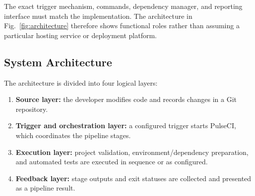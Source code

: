 \documentclass[conference]{IEEEtran}
\begin{document}
The exact trigger mechanism, commands, dependency manager, and reporting interface must match the implementation. The architecture in Fig.~\ref{fig:architecture} therefore shows functional roles rather than assuming a particular hosting service or deployment platform.

\subsection{System Architecture}
The architecture is divided into four logical layers:
\begin{enumerate}
    \item \textbf{Source layer:} the developer modifies code and records changes in a Git repository.
    \item \textbf{Trigger and orchestration layer:} a configured trigger starts PulseCI, which coordinates the pipeline stages.
    \item \textbf{Execution layer:} project validation, environment/dependency preparation, and automated tests are executed in sequence or as configured.
    \item \textbf{Feedback layer:} stage outputs and exit statuses are collected and presented as a pipeline result.
\end{enumerate}
\end{document}
